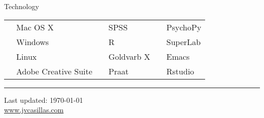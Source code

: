\documentclass[11pt,letterpaper]{moderncv}
\begin{document}
{\color{UAred} Technology} \\

\begin{tabular}{p{1.15in}lp{.7in}lp{1.1in}l}
   & Mac OS X             & & SPSS       & \phantom{.} & PsychoPy \\ [-2.5ex]
   & Windows              & & R          & \phantom{.} & SuperLab \\ [-2.5ex]
   & Linux                & & Goldvarb X & \phantom{.} & Emacs \\ [-2.5ex]
   & Adobe Creative Suite & & Praat      & \phantom{.} & Rstudio \\
\end{tabular}


\noindent \rule{490pt}{.5 mm}

\smallskip

\begin{center}
  \begin{footnotesize}
    Last updated: \today \\
    \href{http://www.jvcasillas.com}{www.jvcasillas.com}
  \end{footnotesize}
\end{center}


\end{document}
